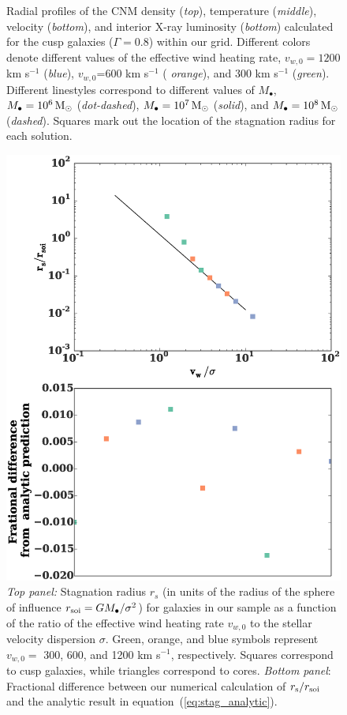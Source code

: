 \documentclass[usenatbib,fleqn]{mn2e}
\newcommand{\Mbh}[1][]{M_{\bullet#1}}
\newcommand{\vwO}{v_{w,0}}
\begin{document}
\begin{figure}
  \caption{\label{fig:profiles}Radial profiles of the CNM density
    ({\it top}), temperature ({\it middle}), velocity ({\it bottom}),
    and interior X-ray luminosity ({\it bottom}) calculated for the
    cusp galaxies ($\Gamma=0.8$) within our grid.  Different colors
    denote different values of the effective wind heating rate,
    $\vwO=1200$ km s$^{-1}$ ({\it blue}), $\vwO$=600 km s$^{-1}$ ({\it
      orange}), and 300 km s$^{-1}$ ({\it green}).  Different
    linestyles correspond to different values of $\Mbh$, $\Mbh=10^6
    \Msun$ ({\it dot-dashed}), $\Mbh=10^7 \Msun$ ({\it solid}), and
    $\Mbh=10^8 \Msun$ ({\it dashed}). Squares mark out the location of
    the stagnation radius for each solution.
 }
\end{figure}

\begin{figure}
  \includegraphics[width=\columnwidth]{rs.eps}
  \caption{\label{fig:stag} \emph{Top panel:} Stagnation radius
    $r_{s}$ (in units of the radius of the sphere of influence $r_{\rm
      soi} = GM_{\bullet}/\sigma^{2}$) for galaxies in our sample as a
    function of the ratio of the effective wind heating rate $v_{w,0}$
    to the stellar velocity dispersion $\sigma$.  Green, orange, and
    blue symbols represent $v_{w,0} =$ 300, 600, and 1200 km s$^{-1}$,
    respectively.  Squares correspond to cusp galaxies, while
    triangles correspond to cores. \emph{Bottom panel}: Fractional
    difference between our numerical calculation of $r_{\rm s}/r_{\rm
      soi}$ and the analytic result in
    equation~(\ref{eq:stag_analytic}). }
\end{figure}
\end{document}
